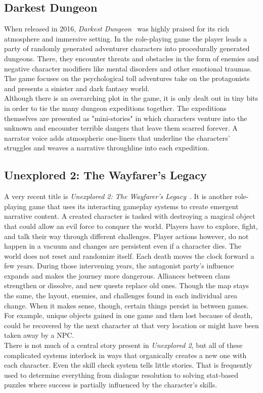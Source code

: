 \subsection{Darkest Dungeon}
When released in 2016, \textit{Darkest Dungeon}~\cite{dungeon} was highly praised for its rich atmosphere and immersive setting. In the role-playing game the player leads a party of randomly generated adventurer characters into procedurally generated dungeons. There, they encounter threats and obstacles in the form of enemies and negative character modifiers like mental disorders and other emotional traumas. The game focuses on the psychological toll adventures take on the protagonists and presents a sinister and dark fantasy world.\\
Although there is an overarching plot in the game, it is only dealt out in tiny bits in order to tie the many dungeon expeditions together. The expeditions themselves are presented as "mini-stories" in which characters venture into the unknown and encounter terrible dangers that leave them scarred forever. A narrator voice adds atmospheric one-liners that underline the characters' struggles and weaves a narrative throughline into each expedition.
\subsection{Unexplored 2: The Wayfarer's Legacy}
A very recent title is \textit{Unexplored 2: The Wayfarer's Legacy}~\cite{unexplored}. It is another role-playing game that uses its interacting gameplay systems to create emergent narrative content. A created character is tasked with destroying a magical object that could allow an evil force to conquer the world. Players have to explore, fight, and talk their way through different challenges. Player actions however, do not happen in a vacuum and changes are persistent even if a character dies. The world does not reset and randomize itself. Each death moves the clock forward a few years. During those intervening years, the antagonist party's influence expands and makes the journey more dangerous. Alliances between clans strengthen or dissolve, and new quests replace old ones. Though the map stays the same, the layout, enemies, and challenges found in each individual area change. When it makes sense, though, certain things persist in between games. For example, unique objects gained in one game and then lost because of death, could be recovered by the next character at that very location or might have been taken away by a NPC.\\
There is not much of a central story present in \textit{Unexplored 2}, but all of these complicated systems interlock in ways that organically creates a new one with each character. Even the skill check system tells little stories. That is frequently used to determine everything from dialogue resolution to solving stat-based puzzles where success is partially influenced by the character's skills.
